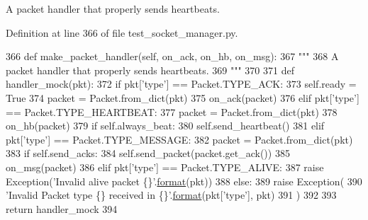 \begin{DoxyVerb}A packet handler that properly sends heartbeats.
\end{DoxyVerb}
 

Definition at line 366 of file test\+\_\+socket\+\_\+manager.\+py.


\begin{DoxyCode}
366     \textcolor{keyword}{def }make\_packet\_handler(self, on\_ack, on\_hb, on\_msg):
367         \textcolor{stringliteral}{"""}
368 \textcolor{stringliteral}{        A packet handler that properly sends heartbeats.}
369 \textcolor{stringliteral}{        """}
370 
371         \textcolor{keyword}{def }handler\_mock(pkt):
372             \textcolor{keywordflow}{if} pkt[\textcolor{stringliteral}{'type'}] == Packet.TYPE\_ACK:
373                 self.ready = \textcolor{keyword}{True}
374                 packet = Packet.from\_dict(pkt)
375                 on\_ack(packet)
376             \textcolor{keywordflow}{elif} pkt[\textcolor{stringliteral}{'type'}] == Packet.TYPE\_HEARTBEAT:
377                 packet = Packet.from\_dict(pkt)
378                 on\_hb(packet)
379                 \textcolor{keywordflow}{if} self.always\_beat:
380                     self.send\_heartbeat()
381             \textcolor{keywordflow}{elif} pkt[\textcolor{stringliteral}{'type'}] == Packet.TYPE\_MESSAGE:
382                 packet = Packet.from\_dict(pkt)
383                 \textcolor{keywordflow}{if} self.send\_acks:
384                     self.send\_packet(packet.get\_ack())
385                 on\_msg(packet)
386             \textcolor{keywordflow}{elif} pkt[\textcolor{stringliteral}{'type'}] == Packet.TYPE\_ALIVE:
387                 \textcolor{keywordflow}{raise} Exception(\textcolor{stringliteral}{'Invalid alive packet \{\}'}.\hyperlink{namespaceparlai_1_1chat__service_1_1services_1_1messenger_1_1shared__utils_a32e2e2022b824fbaf80c747160b52a76}{format}(pkt))
388             \textcolor{keywordflow}{else}:
389                 \textcolor{keywordflow}{raise} Exception(
390                     \textcolor{stringliteral}{'Invalid Packet type \{\} received in \{\}'}.\hyperlink{namespaceparlai_1_1chat__service_1_1services_1_1messenger_1_1shared__utils_a32e2e2022b824fbaf80c747160b52a76}{format}(pkt[\textcolor{stringliteral}{'type'}], pkt)
391                 )
392 
393         \textcolor{keywordflow}{return} handler\_mock
394 
\end{DoxyCode}
\mbox{\label{classparlai_1_1mturk_1_1core_1_1legacy__2018_1_1test_1_1test__socket__manager_1_1MockAgent_aa02e8404e36bc2afa425163c297f7951}} 
